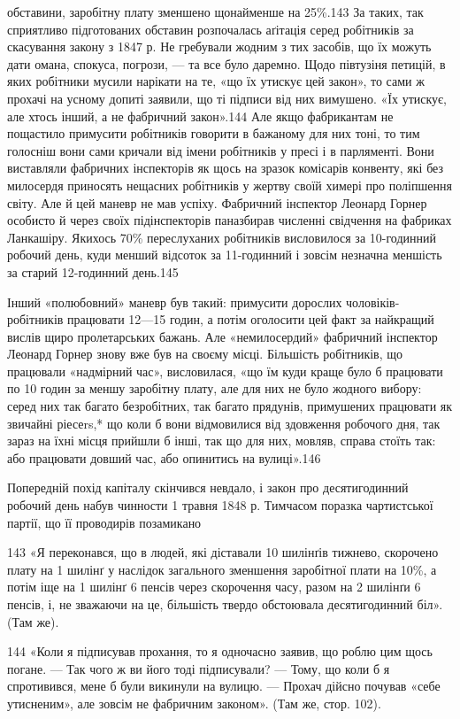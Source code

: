 обставини, заробітну плату зменшено щонайменше на 25\%.143
За таких, так сприятливо підготованих обставин розпочалась
аґітація серед робітників за скасування закону з 1847 р. Не гребували
жодним з тих засобів, що їх можуть дати омана, спокуса,
погрози, — та все було даремно. Щодо півтузіня петицій, в яких
робітники мусили нарікати на те, «що їх утискує цей закон», то
сами ж прохачі на усному допиті заявили, що ті підписи від них
вимушено. «Їх утискує, але хтось інший, а не фабричний закон».144
Але якщо фабрикантам не пощастило примусити робітників
говорити в бажаному для них тоні, то тим голосніш вони сами
кричали від імени робітників у пресі і в парляменті. Вони виставляли
фабричних інспекторів як щось на зразок комісарів конвенту,
які без милосердя приносять нещасних робітників у жертву
своїй химері про поліпшення світу. Але й цей маневр не мав
успіху. Фабричний інспектор Леонард Горнер особисто й через
своїх підінспекторів паназбирав численні свідчення на фабриках
Ланкашіру. Якихось 70\% переслуханих робітників висловилося
за 10-годинний робочий день, куди менший відсоток за 11-годинний
і зовсім незначна меншість за старий 12-годинний день.145

Інший «полюбовний» маневр був такий: примусити дорослих
чоловіків-робітників працювати 12—15 годин, а потім оголосити
цей факт за найкращий вислів щиро пролетарських бажань.
Але «немилосердий» фабричний інспектор Леонард Горнер знову
вже був на своєму місці. Більшість робітників, що працювали
«надмірний час», висловилася, «що їм куди краще було б працювати
по 10 годин за меншу заробітну плату, але для них не було
жодного вибору: серед них так багато безробітних, так багато
прядунів, примушених працювати як звичайні ріесеrs,* що
коли б вони відмовилися від здовження робочого дня, так зараз
на їхні місця прийшли б інші, так що для них, мовляв, справа
стоїть так: або працювати довший час, або опинитись на вулиці».146

Попередній похід капіталу скінчився невдало, і закон про десятигодинний
робочий день набув чинности 1 травня 1848 р. Тимчасом
поразка чартистської партії, що її проводирів позамикано

143 «Я переконався, що в людей, які діставали 10 шилінґів тижнево,
скорочено плату на 1 шилінґ у наслідок загального зменшення заробітної
плати на 10\%, а потім іще на 1 шилінґ 6 пенсів через скорочення часу,
разом на 2 шилінґи 6 пенсів, і, не зважаючи на це, більшість твердо обстоювала
десятигодинний біл». (Там же).

144 «Коли я підписував прохання, то я одночасно заявив, що роблю
цим щось погане. — Так чого ж ви його тоді підписували? — Тому, що коли б
я спротивився, мене б були викинули на вулицю. — Прохач дійсно почував
«себе утисненим», але зовсім не фабричним законом». (Там же, стор. 102).


